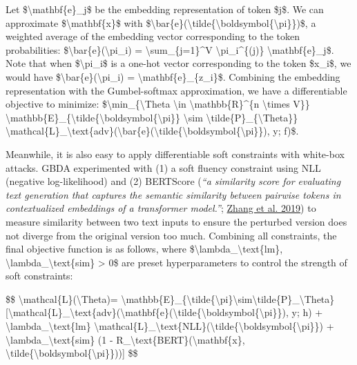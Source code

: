 Let \$\textbackslash mathbf\{e\}\_j\$ be the embedding representation of token \$j\$. We can approximate \$\textbackslash mathbf\{x\}\$ with \$\textbackslash bar\{e\}(\textbackslash tilde\{\textbackslash boldsymbol\{\textbackslash pi\}\})\$, a weighted average of the embedding vector corresponding to the token probabilities: \$\textbackslash bar\{e\}(\textbackslash pi\_i) = \textbackslash sum\_\{j=1\}\^{}V \textbackslash pi\_i\^{}\{(j)\} \textbackslash mathbf\{e\}\_j\$. Note that when \$\textbackslash pi\_i\$ is a one-hot vector corresponding to the token \$x\_i\$, we would have \$\textbackslash bar\{e\}(\textbackslash pi\_i) = \textbackslash mathbf\{e\}\_\{z\_i\}\$. Combining the embedding representation with the Gumbel-softmax approximation, we have a differentiable objective to minimize: \$\textbackslash min\_\{\textbackslash Theta \textbackslash in \textbackslash mathbb\{R\}\^{}\{n \textbackslash times V\}\} \textbackslash mathbb\{E\}\_\{\textbackslash tilde\{\textbackslash boldsymbol\{\textbackslash pi\}\} \textbackslash sim \textbackslash tilde\{P\}\_\{\textbackslash Theta\}\} \textbackslash mathcal\{L\}\_\textbackslash text\{adv\}(\textbackslash bar\{e\}(\textbackslash tilde\{\textbackslash boldsymbol\{\textbackslash pi\}\}), y; f)\$.

Meanwhile, it is also easy to apply differentiable soft constraints with white-box attacks. GBDA experimented with (1) a soft fluency constraint using NLL (negative log-likelihood) and (2) BERTScore (\emph{``a similarity score for evaluating text generation that captures the semantic similarity between pairwise tokens in contextualized embeddings of a transformer model.''}; \href{https://arxiv.org/abs/1904.09675}{Zhang et al. 2019}) to measure similarity between two text inputs to ensure the perturbed version does not diverge from the original version too much. Combining all constraints, the final objective function is as follows, where \$\textbackslash lambda\_\textbackslash text\{lm\}, \textbackslash lambda\_\textbackslash text\{sim\} \textgreater{} 0\$ are preset hyperparameters to control the strength of soft constraints:

\$\$ \textbackslash mathcal\{L\}(\textbackslash Theta)= \textbackslash mathbb\{E\}\_\{\textbackslash tilde\{\textbackslash pi\}\textbackslash sim\textbackslash tilde\{P\}\_\textbackslash Theta\} {[}\textbackslash mathcal\{L\}\_\textbackslash text\{adv\}(\textbackslash mathbf\{e\}(\textbackslash tilde\{\textbackslash boldsymbol\{\textbackslash pi\}\}), y; h) + \textbackslash lambda\_\textbackslash text\{lm\} \textbackslash mathcal\{L\}\_\textbackslash text\{NLL\}(\textbackslash tilde\{\textbackslash boldsymbol\{\textbackslash pi\}\}) + \textbackslash lambda\_\textbackslash text\{sim\} (1 - R\_\textbackslash text\{BERT\}(\textbackslash mathbf\{x\}, \textbackslash tilde\{\textbackslash boldsymbol\{\textbackslash pi\}\})){]} \$\$

